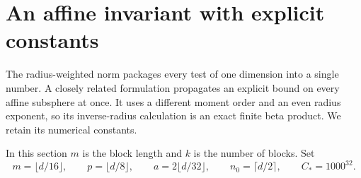 \section{An affine invariant with explicit constants}\label{s:affine-invariant}

The radius-weighted norm packages every test of one dimension into a
single number. A closely related formulation propagates an explicit
bound on every affine subsphere at once. It uses a different moment
order and an even radius exponent, so its inverse-radius calculation
is an exact finite beta product. We retain its numerical constants.

In this section \(m\) is the block length and \(k\) is the number of
blocks. Set
\begin{equation}\label{s:affine-parameters}
 m=\lfloor d/16\rfloor,\qquad p=\lfloor d/8\rfloor,\qquad
 a=2\lfloor d/32\rfloor,\qquad n_0=\lceil d/2\rceil,\qquad
 C_*=1000^{32}.
\end{equation}

